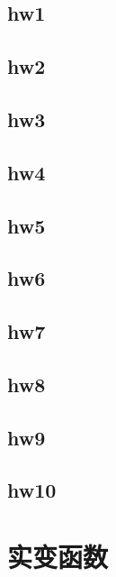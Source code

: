 \documentclass{mynote}
\begin{document}
\section{hw1}

\section{hw2}

\section{hw3}

\section{hw4}

\section{hw5}

\section{hw6}

\section{hw7}

\section{hw8}

\section{hw9}

\section{hw10}


\chapter{实变函数}







\end{document}

